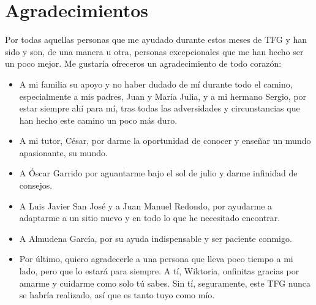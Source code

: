 
\chapter{Agradecimientos}

Por todas aquellas personas que me ayudado durante estos meses de TFG y han sido y son, de una manera u otra, personas excepcionales que me han hecho ser un poco mejor. Me gustaría ofreceros un agradecimiento de todo corazón: 
\begin{itemize}
\item A mi familia su apoyo y no haber dudado de mí durante todo el camino, especialmente a mis padres, Juan y María Julia, y a mi hermano Sergio, por estar siempre ahí para mí, tras todas las adversidades y circunstancias que han hecho este camino un poco más duro. 
\item A mi tutor, César, por darme la oportunidad de conocer y enseñar un mundo apasionante, su mundo. 
\item A Óscar Garrido por aguantarme bajo el sol de julio y darme infinidad de consejos.
\item A Luis Javier San José y a Juan Manuel Redondo, por ayudarme a adaptarme a un sitio nuevo y en todo lo que he necesitado encontrar.
\item A Almudena García, por su ayuda indispensable y ser paciente conmigo.
\item Por último, quiero agradecerle a una persona que lleva poco tiempo a mi lado, pero que lo estará para siempre. A tí, Wiktoria, onfinitas gracias por amarme y cuidarme como solo tú sabes. Sin tí, seguramente, este TFG nunca se habría realizado, así que es tanto tuyo como mío. 
\end{itemize}